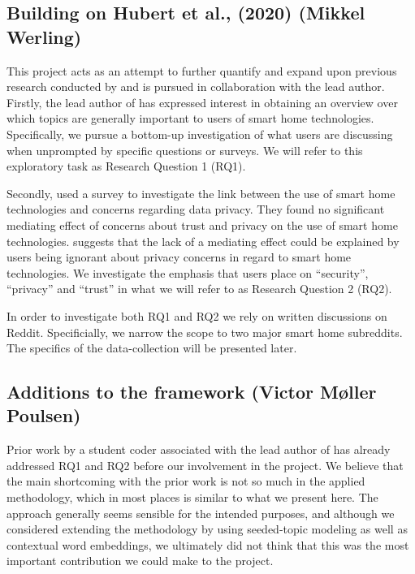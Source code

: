 \documentclass{article}
\begin{document}
    \subsection{Building on Hubert et al., (2020) (Mikkel Werling)}
    This project acts as an attempt to further quantify and expand upon previous research conducted by  and is pursued in collaboration with the lead author. Firstly, the lead author of  has expressed interest in obtaining an overview over which topics are generally important to users of smart home technologies. Specifically, we pursue a bottom-up investigation of what users are discussing when unprompted by specific questions or surveys. We will refer to this exploratory task as Research Question 1 (RQ1). 

Secondly,  used a survey to investigate the link between the use of smart home technologies and concerns regarding data privacy. They found no significant mediating effect of concerns about trust and privacy on the use of smart home technologies.  suggests that the lack of a mediating effect could be explained by users being ignorant about privacy concerns in regard to smart home technologies. We investigate the emphasis that users place on “security”, “privacy” and “trust” in what we will refer to as Research Question 2 (RQ2). 

In order to investigate both RQ1 and RQ2 we rely on written discussions on Reddit. Specificially, we narrow the scope to two major smart home subreddits. The specifics of the data-collection will be presented later. 

    \subsection{Additions to the framework (Victor Møller Poulsen)}
    Prior work by a student coder associated with the lead author of  has already addressed RQ1 and RQ2 before our involvement in the project. We believe that the main shortcoming with the prior work is not so much in the applied methodology, which in most places is similar to what we present here. The approach generally seems sensible for the intended purposes, and although we considered extending the methodology by using seeded-topic modeling as well as contextual word embeddings, we ultimately did not think that this was the most important contribution we could make to the project. 
\end{document}
